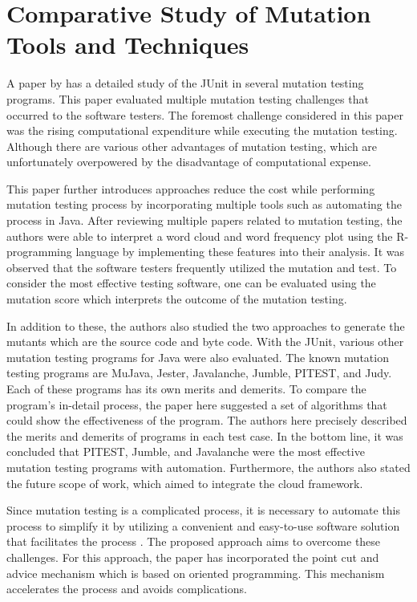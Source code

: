 \section{Comparative Study of Mutation Tools and Techniques}
A paper by \cite{ref22} has a detailed study of the JUnit in several mutation testing programs. This paper evaluated multiple mutation testing challenges that occurred to the software testers. The foremost challenge considered in this paper was the rising computational expenditure while executing the mutation testing. Although there are various other advantages of mutation testing, which are unfortunately overpowered by the disadvantage of computational expense. \par 
This paper further introduces approaches reduce the cost while performing mutation testing process by incorporating multiple tools such as automating the process in Java. After reviewing multiple papers related to mutation testing, the authors were able to interpret a word cloud and word frequency plot using the R-programming language by implementing these features into their analysis. It was observed that the software testers frequently utilized the mutation and test. To consider the most effective testing software, one can be evaluated using the mutation score which interprets the outcome of the mutation testing.\par 
In addition to these, the authors also studied the two approaches to generate the mutants which are the source code and byte code. With the JUnit, various other mutation testing programs for Java were also evaluated. The known mutation testing programs are MuJava, Jester, Javalanche, Jumble, PITEST, and Judy. Each of these programs has its own merits and demerits. To compare the program’s in-detail process, the paper here suggested a set of algorithms that could show the effectiveness of the program. The authors here precisely described the merits and demerits of programs in each test case. In the bottom line, it was concluded that PITEST, Jumble, and Javalanche were the most effective mutation testing programs with automation. Furthermore, the authors also stated the future scope of work, which aimed to integrate the cloud framework.\par 
Since mutation testing is a complicated process, it is necessary to automate this process to simplify it by utilizing a convenient and easy-to-use software solution that facilitates the process \cite{ref23}. The proposed approach aims to overcome these challenges. For this approach, the paper has incorporated the point cut and advice mechanism which is based on oriented programming. This mechanism accelerates the process and avoids complications. \par 
